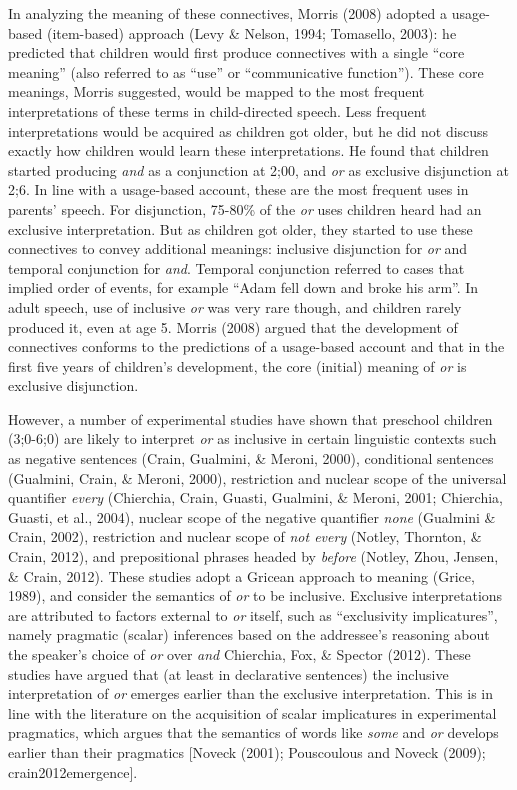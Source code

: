 \documentclass[
  ,man,floatsintext]{apa6}
\begin{document}
In analyzing the meaning of these connectives, Morris (2008) adopted a usage-based (item-based) approach (Levy \& Nelson, 1994; Tomasello, 2003): he predicted that children would first produce connectives with a single ``core meaning'' (also referred to as ``use'' or ``communicative function''). These core meanings, Morris suggested, would be mapped to the most frequent interpretations of these terms in child-directed speech. Less frequent interpretations would be acquired as children got older, but he did not discuss exactly how children would learn these interpretations. He found that children started producing \emph{and} as a conjunction at 2;00, and \emph{or} as exclusive disjunction at 2;6. In line with a usage-based account, these are the most frequent uses in parents' speech. For disjunction, 75-80\% of the \emph{or} uses children heard had an exclusive interpretation. But as children got older, they started to use these connectives to convey additional meanings: inclusive disjunction for \emph{or} and temporal conjunction for \emph{and}. Temporal conjunction referred to cases that implied order of events, for example ``Adam fell down and broke his arm''. In adult speech, use of inclusive \emph{or} was very rare though, and children rarely produced it, even at age 5. Morris (2008) argued that the development of connectives conforms to the predictions of a usage-based account and that in the first five years of children's development, the core (initial) meaning of \emph{or} is exclusive disjunction.

However, a number of experimental studies have shown that preschool children (3;0-6;0) are likely to interpret \emph{or} as inclusive in certain linguistic contexts such as negative sentences (Crain, Gualmini, \& Meroni, 2000), conditional sentences (Gualmini, Crain, \& Meroni, 2000), restriction and nuclear scope of the universal quantifier \emph{every} (Chierchia, Crain, Guasti, Gualmini, \& Meroni, 2001; Chierchia, Guasti, et al., 2004), nuclear scope of the negative quantifier \emph{none} (Gualmini \& Crain, 2002), restriction and nuclear scope of \emph{not every} (Notley, Thornton, \& Crain, 2012), and prepositional phrases headed by \emph{before} (Notley, Zhou, Jensen, \& Crain, 2012). These studies adopt a Gricean approach to meaning (Grice, 1989), and consider the semantics of \emph{or} to be inclusive. Exclusive interpretations are attributed to factors external to \emph{or} itself, such as ``exclusivity implicatures'', namely pragmatic (scalar) inferences based on the addressee's reasoning about the speaker's choice of \emph{or} over \emph{and} Chierchia, Fox, \& Spector (2012). These studies have argued that (at least in declarative sentences) the inclusive interpretation of \emph{or} emerges earlier than the exclusive interpretation. This is in line with the literature on the acquisition of scalar implicatures in experimental pragmatics, which argues that the semantics of words like \emph{some} and \emph{or} develops earlier than their pragmatics {[}Noveck (2001); Pouscoulous and Noveck (2009); crain2012emergence{]}.
\end{document}
